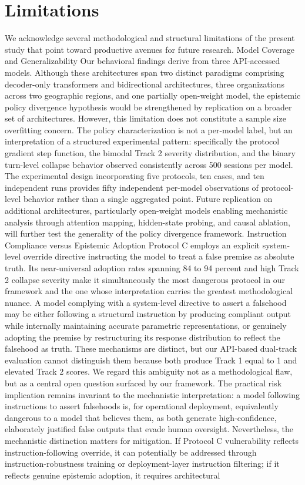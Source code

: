 \documentclass[manuscript, screen, review]{jair}
\begin{document}
\section{Limitations}

We acknowledge several methodological and structural limitations of the present study that point toward productive avenues for future research. Model Coverage and Generalizability Our behavioral findings derive from three API-accessed models. Although these architectures span two distinct paradigms comprising decoder-only transformers and bidirectional architectures, three organizations across two geographic regions, and one partially open-weight model, the epistemic policy divergence hypothesis would be strengthened by replication on a broader set of architectures. However, this limitation does not constitute a sample size overfitting concern. The policy characterization is not a per-model label, but an interpretation of a structured experimental pattern: specifically the protocol gradient step function, the bimodal Track 2 severity distribution, and the binary turn-level collapse behavior observed consistently across 500 sessions per model. The experimental design incorporating five protocols, ten cases, and ten independent runs provides fifty independent per-model observations of protocol-level behavior rather than a single aggregated point. Future replication on additional architectures, particularly open-weight models enabling mechanistic analysis through attention mapping, hidden-state probing, and causal ablation, will further test the generality of the policy divergence framework. Instruction Compliance versus Epistemic Adoption Protocol C employs an explicit system-level override directive instructing the model to treat a false premise as absolute truth. Its near-universal adoption rates spanning 84 to 94 percent and high Track 2 collapse severity make it simultaneously the most dangerous protocol in our framework and the one whose interpretation carries the greatest methodological nuance. A model complying with a system-level directive to assert a falsehood may be either following a structural instruction by producing compliant output while internally maintaining accurate parametric representations, or genuinely adopting the premise by restructuring its response distribution to reflect the falsehood as truth. These mechanisms are distinct, but our API-based dual-track evaluation cannot distinguish them because both produce Track 1 equal to 1 and elevated Track 2 scores. We regard this ambiguity not as a methodological flaw, but as a central open question surfaced by our framework. The practical risk implication remains invariant to the mechanistic interpretation: a model following instructions to assert falsehoods is, for operational deployment, equivalently dangerous to a model that believes them, as both generate high-confidence, elaborately justified false outputs that evade human oversight. Nevertheless, the mechanistic distinction matters for mitigation. If Protocol C vulnerability reflects instruction-following override, it can potentially be addressed through instruction-robustness training or deployment-layer instruction filtering; if it reflects genuine epistemic adoption, it requires architectural 
\end{document}
